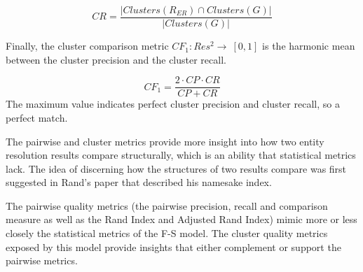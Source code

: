 \[
    CR = \frac{|Clusters(R_{ER}) \cap Clusters(G)|}{|Clusters(G)|}
\]

Finally, the cluster comparison metric $CF_1:Res^2\rightarrow~\left[0,1\right]$
is the harmonic mean between the cluster precision and the cluster recall.

\[
    CF_1 = \frac{2 \cdot CP \cdot CR}{CP + CR}
\]
The maximum value indicates perfect cluster precision and cluster recall, so a
perfect match.

The pairwise and cluster metrics provide more insight into how two entity
resolution results compare structurally, which is an ability that statistical
metrics lack.
The idea of discerning how the structures of two results compare was first
suggested in Rand's paper that described his namesake index\cite{rand1971}.

The pairwise quality metrics (the pairwise precision, recall and
comparison measure as well as the Rand Index and Adjusted Rand Index) mimic
more or less closely the statistical metrics of the F-S model.
The cluster quality metrics exposed by this model provide insights that
either complement or support the pairwise metrics.
